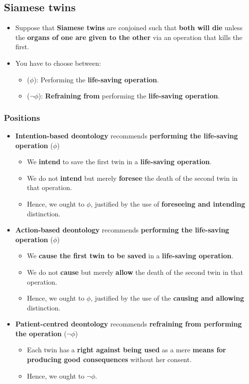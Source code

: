 \documentclass[11pt]{article}
\begin{document}
\subsection{Siamese twins}
\label{sec:org64e9c29}
\begin{itemize}
\item Suppose that \textbf{Siamese twins} are conjoined such that \textbf{both will die} unless the \textbf{organs of one are given to the other} via an operation that kills the first.
\item You have to choose between:
\begin{itemize}
\item (\(\phi\)): Performing the \textbf{life-saving operation}.
\item (\(\neg \phi\)): \textbf{Refraining from} performing the \textbf{life-saving operation}.
\end{itemize}
\end{itemize}
\subsubsection{Positions}
\label{sec:org4b2a7f0}
\begin{itemize}
\item \textbf{Intention-based deontology} recommends \textbf{performing the life-saving operation} (\(\phi\))
\begin{itemize}
\item We \textbf{intend} to save the first twin in a \textbf{life-saving operation}.
\item We do not \textbf{intend} but merely \textbf{foresee} the death of the second twin in that operation.
\item Hence, we ought to \(\phi\), justified by the use of \textbf{foreseeing and intending} distinction.
\end{itemize}
\item \textbf{Action-based deontology} recommends \textbf{performing the life-saving operation} (\(\phi\))
\begin{itemize}
\item We \textbf{cause the first twin to be saved} in a \textbf{life-saving operation}.
\item We do not \textbf{cause} but merely \textbf{allow} the death of the second twin in that operation.
\item Hence, we ought to \(\phi\), justified by the use of the \textbf{causing and allowing} distinction.
\end{itemize}
\item \textbf{Patient-centred deontology} recommends \textbf{refraining from performing the operation} (\(\neg \phi\))
\begin{itemize}
\item Each twin has a \textbf{right against being used} as a mere \textbf{means for producing good consequences} without her consent.
\item Hence, we ought to \(\neg \phi\).
\end{itemize}
\end{itemize}
\end{document}
